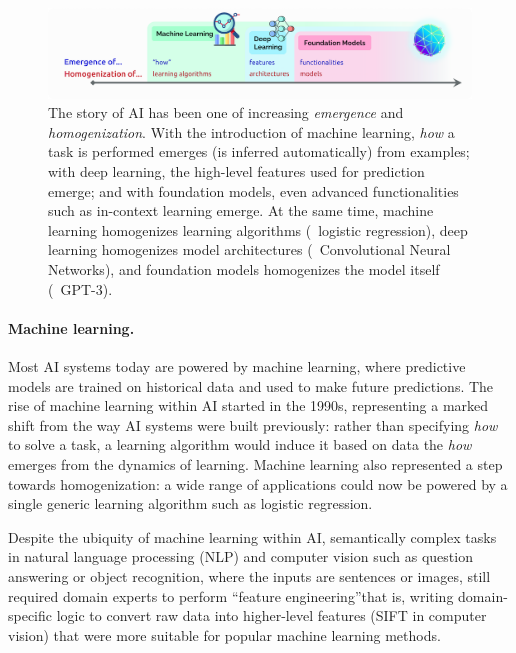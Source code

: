 \begin{figure}[ht]
\centering
\includegraphics[width=\linewidth]{figures/Intro_Evolution.png}
\caption{
\label{fig:evolution}
The story of AI has been one of increasing \emph{emergence} and \emph{homogenization}.
With the introduction of machine learning,
\emph{how} a task is performed emerges (is inferred automatically) from examples;
with deep learning, the high-level features used for prediction emerge;
and with foundation models, even advanced functionalities such as in-context learning emerge.
At the same time,
machine learning homogenizes learning algorithms (\eg~logistic regression),
deep learning homogenizes model architectures (\eg~Convolutional Neural Networks),
and foundation models homogenizes the model itself (\eg~GPT-3).
}
\end{figure}

\paragraph{Machine learning.}

Most AI systems today are powered by machine learning,
where predictive models are trained on historical data
and used to make future predictions.
The rise of machine learning within AI started in the 1990s,
representing a marked shift from the way AI systems were built previously:
rather than specifying \emph{how} to solve a task,
a learning algorithm would induce it based on data\dash{}\ie
the \emph{how} emerges from the dynamics of learning.
Machine learning also represented a step towards homogenization:
a wide range of applications
could now be powered by a single generic learning algorithm
such as logistic regression.

Despite the ubiquity of machine learning within AI,
semantically complex tasks
in natural language processing (NLP) and computer vision
such as question answering or object recognition,
where the inputs are sentences or images,
still required domain experts to perform ``feature engineering''\dash{}that is,
writing domain-specific logic to convert raw data into higher-level features
(\eg SIFT \citep{lowe1999sift} in computer vision)
that were more suitable for popular machine learning methods.

